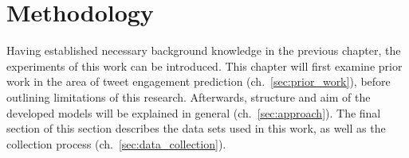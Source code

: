 \chapter{Methodology}
\label{ch:methodology}

Having established necessary background knowledge in the previous chapter,
the experiments of this work can be introduced.
This chapter will first examine prior work in the area of tweet engagement
prediction (ch.~\ref{sec:prior_work}), before outlining limitations of this
research.
Afterwards, structure and aim of the developed models will be explained in general (ch.~\ref{sec:approach}).
The final section of this section describes the data sets used in this work,
as well as the collection process (ch.~\ref{sec:data_collection}).









